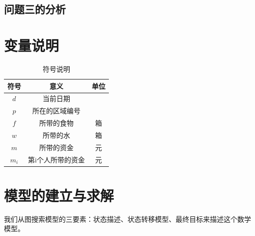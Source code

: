 \documentclass[withoutpreface,bwprint]{cumcmthesis} %
\begin{document}
\subsection{问题三的分析}



\section{变量说明}

\begin{table}[!htbp]
    \caption{符号说明}\label{tab:001} \centering
    \begin{tabular}{ccc}
        \toprule[1.5pt]
        符号 & 意义 & 单位\\
        \midrule[1pt]
        $d$ & 当前日期 & \\
        $p$ & 所在的区域编号 & \\
        $f$ & 所带的食物 & 箱\\
        $w$ & 所带的水 & 箱\\
        $m$ & 所带的资金 & 元\\
        $m_i$ & 第i个人所带的资金 & 元\\
        \bottomrule[1.5pt]
    \end{tabular}
\end{table}

\section{模型的建立与求解}

我们从图搜索模型的三要素：状态描述、状态转移模型、最终目标来描述这个数学模型。
\end{document}
